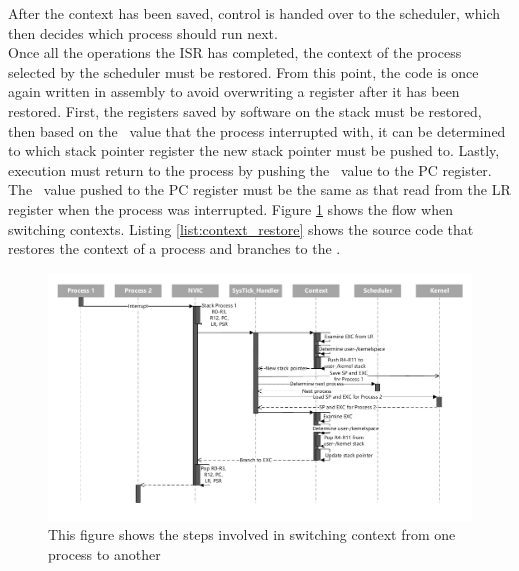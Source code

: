 After the context has been saved, control is handed over to the scheduler, which
then decides which process should run next.\\
Once all the operations the ISR has completed, the context of the process
selected by the scheduler must be restored. From this point, the code is once
again written in assembly to avoid overwriting a register after it has been
restored. First, the registers saved by software on the stack must be restored,
then based on the \excreturn\ value that the process interrupted with, it can be
determined to which stack pointer register the new stack pointer must be pushed
to. Lastly, execution must return to the process by pushing the \excreturn\ value
to the PC register. The \excreturn\ value pushed to the PC register must be the
same as that read from the LR register when the process was interrupted.
Figure \ref{fig:scheduling_sequence_diagram} shows the flow when switching contexts.
Listing \ref{list:context_restore} shows the source code that restores the
context of a process and branches to the \excreturn .
\begin{figure}[H]
	\centerline{\includegraphics[width=\paperwidth-2cm,]{figures/scheduling_sequence_diagram.pdf}}
    \caption{This figure shows the steps involved in switching context from one
	process to another}
    \label{fig:scheduling_sequence_diagram}
\end{figure}
